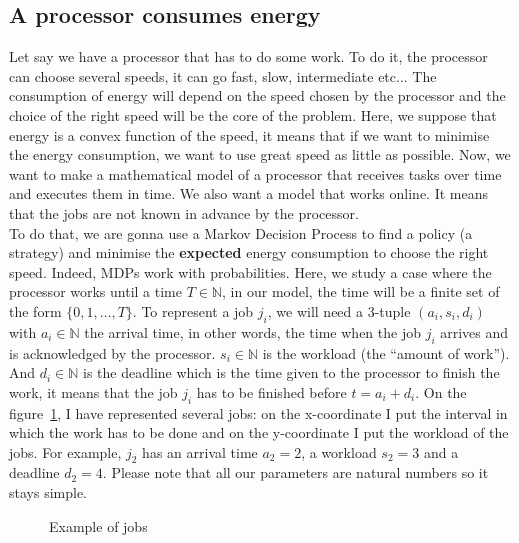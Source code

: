 \documentclass[
10pt, %
a4paper, %
oneside, %
headinclude,footinclude, %
BCOR5mm, %
]{scrartcl}
\newcommand{\N}{\mathbb{N}}
\begin{document}
\subsection{A processor consumes energy}
Let say we have a processor that has to do some work. To do it,
the processor can choose several speeds, it can go fast, slow,
intermediate etc... The consumption of energy will depend on the speed
chosen by the processor and the choice of the right speed will be the
core of the problem.
Here, we suppose that energy is a convex function of
the speed, it means that if we want to minimise the energy
consumption, we want to use great speed as little as possible. Now, we
want to make a mathematical model of a processor that receives tasks
over time and executes them in time. We also want a model that works
online. It means that the jobs are not known in advance by the
processor.\\

To do that, we are gonna use a Markov Decision Process to
find a policy (a strategy) and
minimise the \textbf{expected} energy consumption to choose the right
speed. Indeed, MDPs work with probabilities.
Here, we study a case where the processor works until a time
$T\in\N$, in our model, the time will be a finite set of the form
$\{0,1,\dots,T\}$. To represent a job $j_i$, we will need a 3-tuple
$(a_i,s_i,d_i)$ with $a_i\in\N$ the arrival time, in other words, the
time when the job $j_i$ arrives and is acknowledged by the processor. $s_i\in\N$ is the
workload (the ``amount of work''). And $d_i\in\N$ is the deadline
which is the time given to the processor to finish the work,
it means that the job $j_i$ has to be finished before $t=a_i+d_i$. On the
figure~\ref{fig:jobs}, I have represented several jobs: on the x-coordinate
I put the interval in which the work has to be done and on the
y-coordinate I put the workload of the jobs. For example, $j_2$ has an
arrival time $a_2=2$, a workload $s_2=3$ and a deadline
$d_2=4$. Please note that all our parameters are natural numbers so it
stays simple.\\

\begin{figure}
  \centering
  \caption{Example of jobs}
  \label{fig:jobs}  
\end{figure}
\end{document}
